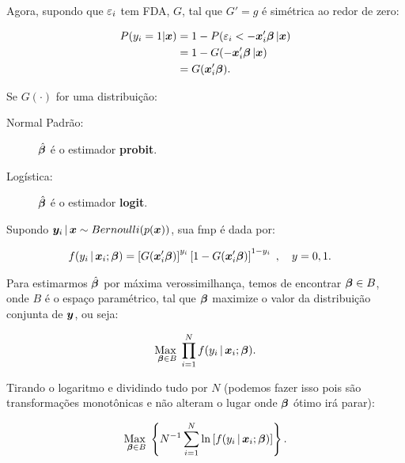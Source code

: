 \documentclass[11pt,oneside,a4paper]{article}
\numberwithin{equation}{section}
\begin{document}
\begin{description}
\begin{description}
\noindent
Agora, supondo que $\varepsilon_{i}$ tem FDA, $G$, tal que $G'=g$ é simétrica ao redor de zero:

\vspace{-1 em}
\begin{align*}
P( y_{i} = 1 | \boldsymbol{x} ) 
&= 1 - P( \varepsilon_{i} < - \boldsymbol{x}_{i}' \boldsymbol{\beta}  \, | \boldsymbol{x} )
\\
&= 1 - G( - \boldsymbol{x}_{i}' \boldsymbol{\beta}  \, | \boldsymbol{x} )
\\
&= G( \boldsymbol{x}_{i}' \boldsymbol{\beta} ).
\end{align*}

Se $G(\cdot)$ for uma distribuição:

\begin{description}
	\item [Normal Padrão:] $\hat{\boldsymbol{\beta}}$ é o estimador \textbf{probit}.
	\item [Logística:] $\hat{\boldsymbol{\beta}}$ é o estimador \textbf{logit}.
\end{description}

Supondo $\boldsymbol{y}_{i} \, | \, \boldsymbol{x} \sim Bernoulli(p(\boldsymbol{x}))$, sua fmp é dada por:

\vspace{-1 em}
\begin{align*}
f( y_{i} \, | \, \boldsymbol{x}_{i} ; \boldsymbol{\beta} ) 
&= 
\left[ G(\boldsymbol{x}_{i}' \boldsymbol{\beta} )  \right]^{y_{i}}
\left[ 1 - G(\boldsymbol{x}_{i}' \boldsymbol{\beta} )  \right]^{1 - y_{i}}
\; , \quad y=0,1.
\end{align*}

Para estimarmos $\hat{\boldsymbol{\beta}}$ por máxima verossimilhança, temos de encontrar $\boldsymbol{\beta} \in B$, onde $B$ é o espaço paramétrico, tal que $\boldsymbol{\beta}$ maximize o valor da distribuição conjunta de $\boldsymbol{y}$, ou seja:

\vspace{-1 em}
\begin{align*}
	\underset{\boldsymbol{\beta} \in B}{\text{Max }} 
	\prod_{i=1}^{N}
	f( y_{i} \, | \, \boldsymbol{x}_{i} ; \boldsymbol{\beta} ).
\end{align*}

\noindent

Tirando o logaritmo e dividindo tudo por $N$ (podemos fazer isso pois são transformações monotônicas e não alteram o lugar onde $\boldsymbol{\beta}$ ótimo irá parar):

\vspace{-1 em}
\begin{align*}
\underset{\boldsymbol{\beta} \in B}{\text{Max }} 
\left\{ 
N^{-1} \sum_{i=1}^{N}
\ln \left[ f( y_{i} \, | \, \boldsymbol{x}_{i} ; \boldsymbol{\beta} ) \right]
\right\}.
\end{align*}


\end{description}
\end{description}
\end{document}
